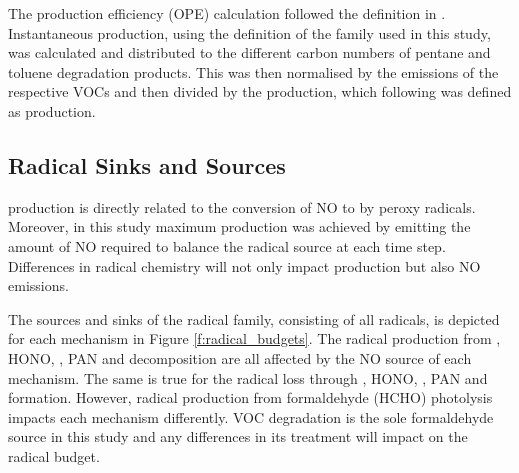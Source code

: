 The  production efficiency (OPE) calculation followed the definition in \citet{Kleinman:2002}.
Instantaneous  production, using the definition of the  family used in this study, was calculated and distributed to the different carbon numbers of pentane and toluene degradation products.
This was then normalised by the emissions of the respective VOCs and then divided by the  production, which following \citet{Kleinman:2002} was defined as  production.

\subsection{Radical Sinks and Sources} \label{ss:radicals}



 production is directly related to the conversion of NO to  by peroxy radicals. 
Moreover, in this study maximum  production was achieved by emitting the amount of NO required to balance the radical source at each time step. 
Differences in radical chemistry will not only impact  production but also NO emissions.

The sources and sinks of the radical family, consisting of all radicals, is depicted for each mechanism in Figure \ref{f:radical_budgets}.
The radical production from , HONO, , PAN and  decomposition are all affected by the NO source of each mechanism.
The same is true for the radical loss through , HONO, , PAN and  formation.
However, radical production from formaldehyde (HCHO) photolysis impacts each mechanism differently.
VOC degradation is the sole formaldehyde source in this study and any differences in its treatment will impact on the radical budget.

